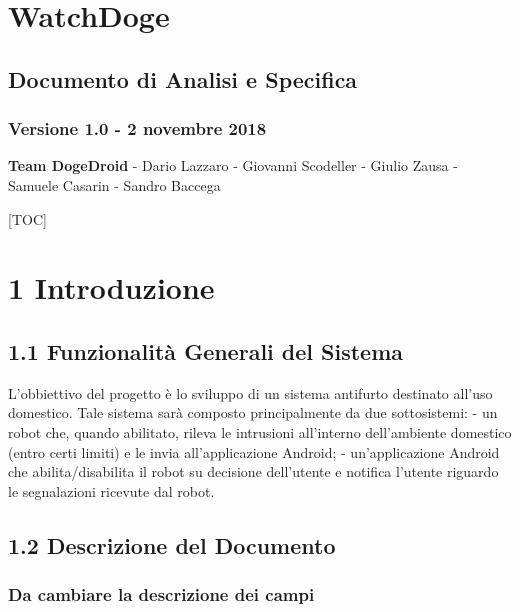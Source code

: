 \documentclass[]{article}
\date{}
\begin{document}
\hypertarget{watchdoge}{%
\section{WatchDoge}\label{watchdoge}}

\hypertarget{documento-di-analisi-e-specifica}{%
\subsection{Documento di Analisi e
Specifica}\label{documento-di-analisi-e-specifica}}

\hypertarget{versione-1.0---2-novembre-2018}{%
\subsubsection{Versione 1.0 - 2 novembre
2018}\label{versione-1.0---2-novembre-2018}}

\textbf{Team DogeDroid} - Dario Lazzaro - Giovanni Scodeller - Giulio
Zausa - Samuele Casarin - Sandro Baccega

{[}TOC{]}

\hypertarget{introduzione}{%
\section{1 Introduzione}\label{introduzione}}

\hypertarget{funzionalituxe0-generali-del-sistema}{%
\subsection{1.1 Funzionalità Generali del
Sistema}\label{funzionalituxe0-generali-del-sistema}}

L'obbiettivo del progetto è lo sviluppo di un sistema antifurto
destinato all'uso domestico. Tale sistema sarà composto principalmente
da due sottosistemi: - un robot che, quando abilitato, rileva le
intrusioni all'interno dell'ambiente domestico (entro certi limiti) e le
invia all'applicazione Android; - un'applicazione Android che
abilita/disabilita il robot su decisione dell'utente e notifica l'utente
riguardo le segnalazioni ricevute dal robot.

\hypertarget{descrizione-del-documento}{%
\subsection{1.2 Descrizione del
Documento}\label{descrizione-del-documento}}

\hypertarget{da-cambiare-la-descrizione-dei-campi}{%
\subsubsection{Da cambiare la descrizione dei
campi}\label{da-cambiare-la-descrizione-dei-campi}}
\end{document}
